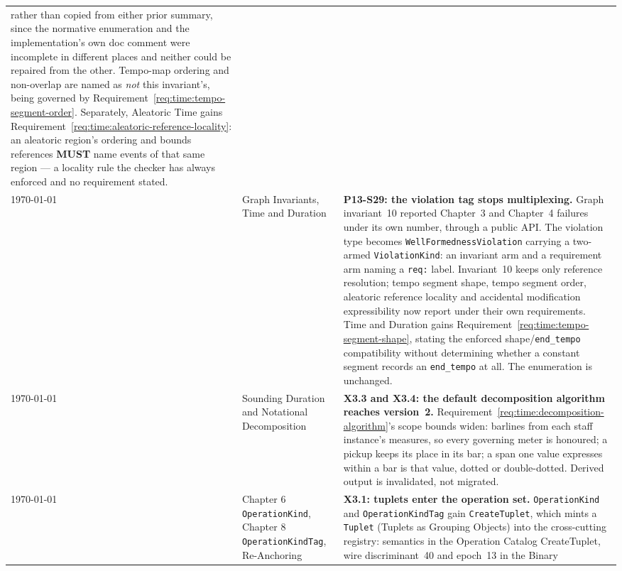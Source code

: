 \documentclass[11pt,letterpaper]{report}
\newcommand{\sectionsc}[1]{{\addfontfeatures{Letters=SmallCaps}#1}}
\newcounter{requirement}[chapter]
\newcommand{\MUST}{\textbf{MUST}}
\begin{document}
\begin{longtable}{p{2cm} p{2.5cm} p{9cm}}
  rather than copied from either prior summary, since the normative enumeration
  and the implementation's own doc comment were incomplete in different places
  and neither could be repaired from the other. Tempo-map ordering and
  non-overlap are named as \emph{not} this invariant's, being governed by
  Requirement~\ref{req:time:tempo-segment-order}. Separately,
  \sectionsc{Aleatoric Time} gains
  Requirement~\ref{req:time:aleatoric-reference-locality}: an aleatoric
  region's ordering and bounds references \MUST{} name events of that same
  region --- a locality rule the checker has always enforced and no requirement
  stated.
  \\
  \today & \sectionsc{Graph Invariants}, \sectionsc{Time and Duration} &
  \textbf{P13-S29: the violation tag stops multiplexing.} Graph invariant~10
  reported Chapter~3 and Chapter~4 failures under its own number, through a
  public API. The violation type becomes \texttt{WellFormednessViolation}
  carrying a two-armed \texttt{ViolationKind}: an invariant arm and a
  requirement arm naming a \texttt{req:} label. Invariant~10 keeps only
  reference resolution; tempo segment shape, tempo segment order, aleatoric
  reference locality and accidental modification expressibility now report
  under their own requirements. \sectionsc{Time and Duration} gains
  Requirement~\ref{req:time:tempo-segment-shape}, stating the enforced
  shape/\texttt{end\_tempo} compatibility without determining whether a
  constant segment records an \texttt{end\_tempo} at all. The enumeration is
  unchanged.
  \\
  \today & \sectionsc{Sounding Duration and Notational Decomposition} &
  \textbf{X3.3 and X3.4: the default decomposition algorithm reaches
  version~2.} Requirement~\ref{req:time:decomposition-algorithm}'s scope
  bounds widen: barlines from each staff instance's measures, so every
  governing meter is honoured; a pickup keeps its place in its bar; a span
  one value expresses within a bar is that value, dotted or double-dotted.
  Derived output is invalidated, not migrated.
  \\
  \today & Chapter 6 \texttt{OperationKind}, Chapter 8
  \texttt{OperationKindTag}, \sectionsc{Re-Anchoring} &
  \textbf{X3.1: tuplets enter the operation set.} \texttt{OperationKind} and
  \texttt{OperationKindTag} gain \texttt{CreateTuplet}, which mints a
  \texttt{Tuplet} (\sectionsc{Tuplets as Grouping Objects}) into the
  cross-cutting registry: semantics in the Operation Catalog
  \sectionsc{CreateTuplet}, wire discriminant~40 and epoch~13 in the Binary

\end{longtable}
\end{document}
